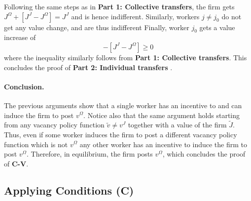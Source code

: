 Following the same steps as in \textbf{Part 1: Collective transfers}, the
firm gets $J^\Omega + [J^J-J^\Omega] = J^J$ and is hence indifferent.
Similarly, workers $j \neq j_0$ do not get any value change, and are thus
indifferent Finally, worker $j_0$ gets a value increase of
\begin{equation*}
[\overline{V}^\Omega-\overline{V}^J ]- [J^J-J^\Omega] \geq 0
\end{equation*}
where the inequality similarly follows from \textbf{Part 1: Collective
transfers}. This concludes the proof of \textbf{Part 2: Individual transfers}%
.

\paragraph{Conclusion.}

The previous arguments show that a single worker has an incentive to and can
induce the firm to post $v^\Omega$. Notice also that the same argument holds
starting from any vacancy policy function $\widetilde{v} \neq v^J$ together with
a value of the firm $\widetilde{J}$. Thus, even if some worker induces the firm
to post a different vacancy policy function which is not $v^\Omega$ any
other worker has an incentive to induce the firm to post $v^\Omega$.
Therefore, in equilibrium, the firm posts $v^\Omega$, which concludes the
proof of \textbf{C-V}.


\subsection{Applying Conditions (C)}

